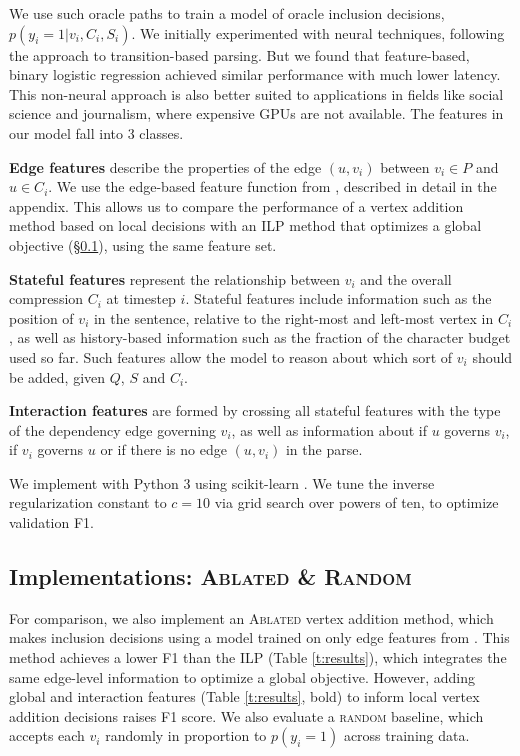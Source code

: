 \documentclass[11pt,a4paper]{article}
\begin{document}
We use such oracle paths to train a model of oracle inclusion decisions, ${p(y_i  = 1 | v_i, C_i, S_i)}$. We initially experimented with neural techniques, following the \citet{D14-1082} approach to transition-based parsing. But we found that feature-based, binary logistic regression achieved similar performance with much lower latency. This non-neural approach is also better suited to applications in fields like social science and journalism, where expensive GPUs are not available. The features in our model fall into 3 classes.

\textbf{Edge features} describe the properties of the edge $(u,v_i)$ between $v_i \in P$ and $u \in C_i$. We use the edge-based feature function from \citet{filippova2013overcoming}, described in detail in the appendix. This allows us to compare the performance of a vertex addition method based on local decisions with an ILP method that optimizes a global objective (\S \ref{s:ablated}), using the same feature set.

\textbf{Stateful features} represent the relationship between $v_i$ and the overall compression $C_i$ at timestep $i$. Stateful features include information such as the position of $v_i$ in the sentence, relative to the right-most and left-most vertex in $C_i$, as well as history-based information such as the fraction of the character budget used so far. Such features allow the model to reason about which sort of $v_i$ should be added, given $Q$, $S$ and $C_i$.

\textbf{Interaction features} are formed by crossing all stateful features with the type of the dependency edge governing $v_i$, as well as information about if $u$ governs $v_i$, if $v_i$ governs $u$ or if there is no edge $(u,v_i)$ in the parse.

We implement with Python 3 using scikit-learn \cite{Pedregosa:2011:SML:1953048.2078195}. We tune the inverse regularization constant to $c=10$ via grid search over powers of ten, to optimize validation F1. 

\subsection{Implementations:  \textsc{Ablated} \& \textsc{Random}}\label{s:ablated}
For comparison, we also implement an \textsc{Ablated} vertex addition method, which makes inclusion decisions using a model trained on only edge features from \citet{filippova2013overcoming}. This method achieves a lower F1 than the ILP (Table \ref{t:results}), which integrates the same edge-level information to optimize a global objective. However, adding global and interaction features (Table \ref{t:results}, bold) to inform local vertex addition decisions raises F1 score. We also evaluate a \textsc{random} baseline, which accepts each $v_i$ randomly in proportion to $p(y_i = 1)$ across training data.
\end{document}
